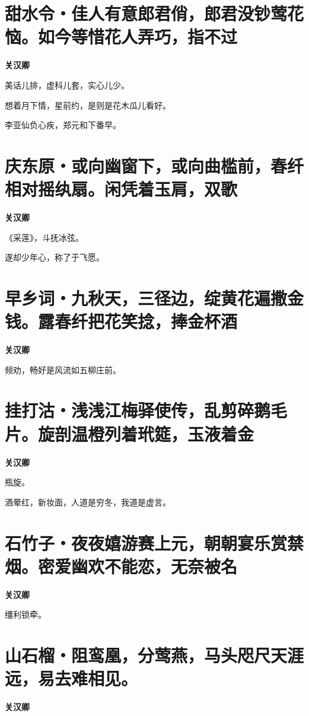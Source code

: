 \documentclass[12pt,a4paper]{ctexbook}
\begin{document}
\section{甜水令・佳人有意郎君俏，郎君没钞莺花恼。如今等惜花人弄巧，指不过}
\textbf{关汉卿}\par\vspace{0.5em}
美话儿排，虚科儿套，实心儿少。\par
想着月下情，星前约，是则是花木瓜儿看好。\par
李亚仙负心疾，郑元和下番早。\par

\section{庆东原・或向幽窗下，或向曲槛前，春纤相对摇纨扇。闲凭着玉肩，双歌}
\textbf{关汉卿}\par\vspace{0.5em}
《采莲》，斗抚冰弦。\par
遂却少年心，称了于飞愿。\par

\section{早乡词・九秋天，三径边，绽黄花遍撒金钱。露春纤把花笑捻，捧金杯酒}
\textbf{关汉卿}\par\vspace{0.5em}
频劝，畅好是风流如五柳庄前。\par

\section{挂打沽・浅浅江梅驿使传，乱剪碎鹅毛片。旋剖温橙列着玳筵，玉液着金}
\textbf{关汉卿}\par\vspace{0.5em}
瓶旋。\par
酒晕红，新妆面，人道是穷冬，我道是虚言。\par

\section{石竹子・夜夜嬉游赛上元，朝朝宴乐赏禁烟。密爱幽欢不能恋，无奈被名}
\textbf{关汉卿}\par\vspace{0.5em}
缰利锁牵。\par

\section{山石榴・阻鸾凰，分莺燕，马头咫尺天涯远，易去难相见。}
\textbf{关汉卿}\par\vspace{0.5em}
\end{document}
